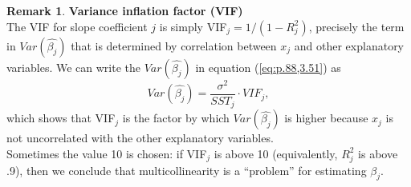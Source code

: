 \documentclass[a4paper, 10pt]{article}
\theoremstyle{definition}	%
\newtheorem*{remark}{Remark}
\begin{document}
\begin{remark}
    \textbf{Variance inflation factor (VIF)}\\
    The VIF for slope coefficient $j$ is simply VIF$_j = 1/(1-R_j^2)$, precisely the term in $Var(\hat{\beta_j})$ that is determined by correlation between $x_j$ and other explanatory variables. We can write the $Var(\hat{\beta_j})$ in equation (\ref{eq:p.88,3.51}) as
    \begin{equation*}
        Var(\hat{\beta_j}) = \frac{\sigma^2}{SST_j} \cdot VIF_j,
    \end{equation*}
    which shows that VIF$_j$ is the factor by which $Var(\hat{\beta_j})$ is higher because $x_j$ is not uncorrelated with the other explanatory variables.\\
    Sometimes the value 10 is chosen: if VIF$_j$ is above 10  (equivalently, $R_j^2$ is above .9), then we conclude that multicollinearity is a ``problem'' for estimating $\beta_j$.
\end{remark}
\end{document}
